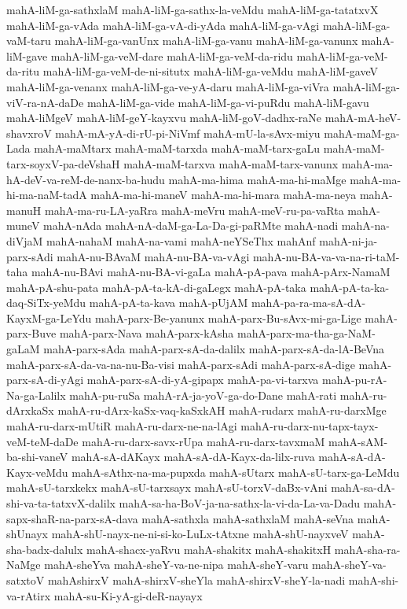 {mahA-liM-ga-sathxlaM
mahA-liM-ga-sathx-la-veMdu
mahA-liM-ga-tatatxvX
mahA-liM-ga-vAda
mahA-liM-ga-vA-di-yAda
mahA-liM-ga-vAgi
mahA-liM-ga-vaM-taru
mahA-liM-ga-vanUnx
mahA-liM-ga-vanu
mahA-liM-ga-vanunx
mahA-liM-gave
mahA-liM-ga-veM-dare
mahA-liM-ga-veM-da-ridu
mahA-liM-ga-veM-da-ritu
mahA-liM-ga-veM-de-ni-situtx
mahA-liM-ga-veMdu
mahA-liM-gaveV
mahA-liM-ga-venanx
mahA-liM-ga-ve-yA-daru
mahA-liM-ga-viVra
mahA-liM-ga-viV-ra-nA-daDe
mahA-liM-ga-vide
mahA-liM-ga-vi-puRdu
mahA-liM-gavu
mahA-liMgeV
mahA-liM-geY-kayxvu
mahA-liM-goV-dadhx-raNe
mahA-mA-heV-shavxroV
mahA-mA-yA-di-rU-pi-NiVmf
mahA-mU-la-sAvx-miyu
mahA-maM-ga-Lada
mahA-maMtarx
mahA-maM-tarxda
mahA-maM-tarx-gaLu
mahA-maM-tarx-soyxV-pa-deVshaH
mahA-maM-tarxva
mahA-maM-tarx-vanunx
mahA-ma-hA-deV-va-reM-de-nanx-ba-hudu
mahA-ma-hima
mahA-ma-hi-maMge
mahA-ma-hi-ma-naM-tadA
mahA-ma-hi-maneV
mahA-ma-hi-mara
mahA-ma-neya
mahA-manuH
mahA-ma-ru-LA-yaRra
mahA-meVru
mahA-meV-ru-pa-vaRta
mahA-muneV
mahA-nAda
mahA-nA-daM-ga-La-Da-gi-paRMte
mahA-nadi
mahA-na-diVjaM
mahA-nahaM
mahA-na-vami
mahA-neYSeThx
mahAnf
mahA-ni-ja-parx-sAdi
mahA-nu-BAvaM
mahA-nu-BA-va-vAgi
mahA-nu-BA-va-va-na-ri-taM-taha
mahA-nu-BAvi
mahA-nu-BA-vi-gaLa
mahA-pA-pava
mahA-pArx-NamaM
mahA-pA-shu-pata
mahA-pA-ta-kA-di-gaLegx
mahA-pA-taka
mahA-pA-ta-ka-daq-SiTx-yeMdu
mahA-pA-ta-kava
mahA-pUjAM
mahA-pa-ra-ma-sA-dA-KayxM-ga-LeYdu
mahA-parx-Be-yanunx
mahA-parx-Bu-sAvx-mi-ga-Lige
mahA-parx-Buve
mahA-parx-Nava
mahA-parx-kAsha
mahA-parx-ma-tha-ga-NaM-gaLaM
mahA-parx-sAda
mahA-parx-sA-da-dalilx
mahA-parx-sA-da-lA-BeVna
mahA-parx-sA-da-va-na-nu-Ba-visi
mahA-parx-sAdi
mahA-parx-sA-dige
mahA-parx-sA-di-yAgi
mahA-parx-sA-di-yA-gipapx
mahA-pa-vi-tarxva
mahA-pu-rA-Na-ga-Lalilx
mahA-pu-ruSa
mahA-rA-ja-yoV-ga-do-Dane
mahA-rati
mahA-ru-dArxkaSx
mahA-ru-dArx-kaSx-vaq-kaSxkAH
mahA-rudarx
mahA-ru-darxMge
mahA-ru-darx-mUtiR
mahA-ru-darx-ne-na-lAgi
mahA-ru-darx-nu-tapx-tayx-veM-teM-daDe
mahA-ru-darx-savx-rUpa
mahA-ru-darx-tavxmaM
mahA-sAM-ba-shi-vaneV
mahA-sA-dAKayx
mahA-sA-dA-Kayx-da-lilx-ruva
mahA-sA-dA-Kayx-veMdu
mahA-sAthx-na-ma-pupxda
mahA-sUtarx
mahA-sU-tarx-ga-LeMdu
mahA-sU-tarxkekx
mahA-sU-tarxsayx
mahA-sU-torxV-daBx-vAni
mahA-sa-dA-shi-va-ta-tatxvX-dalilx
mahA-sa-ha-BoV-ja-na-sathx-la-vi-da-La-va-Dadu
mahA-sapx-shaR-na-parx-sA-dava
mahA-sathxla
mahA-sathxlaM
mahA-seVna
mahA-shUnayx
mahA-shU-nayx-ne-ni-si-ko-LuLx-tAtxne
mahA-shU-nayxveV
mahA-sha-badx-dalulx
mahA-shacx-yaRvu
mahA-shakitx
mahA-shakitxH
mahA-sha-ra-NaMge
mahA-sheYva
mahA-sheY-va-ne-nipa
mahA-sheY-varu
mahA-sheY-va-satxtoV
mahAshirxV
mahA-shirxV-sheYla
mahA-shirxV-sheY-la-nadi
mahA-shi-va-rAtirx
mahA-su-Ki-yA-gi-deR-nayayx
}
